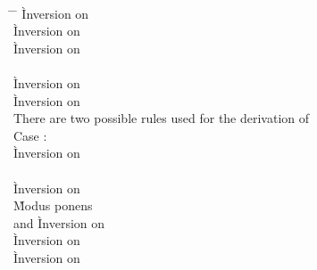 \begin{description}
\item[] \ \\
  \newcommand{\pushretstack}{\frameexp{F}{\return{\cdot}}}
  \begin{tabbing}
  \hspace{3em} \= \hspace{3em} \= \kill
    \` Inversion on  \\
    \` Inversion on  \\
    \` Inversion on  \\
   \\
    \` Inversion on  \\
    \` Inversion on  \\
  There are two possible rules used for the derivation of
     \\
  Case : \+ \\
      \` Inversion on  \\
     \\
      \` Inversion on  \\
      \` Modus ponens \\
     and 
      \` Inversion on  \\
      \` Inversion on  \\
      \` Inversion on  \\

\end{tabbing}
\end{description}
